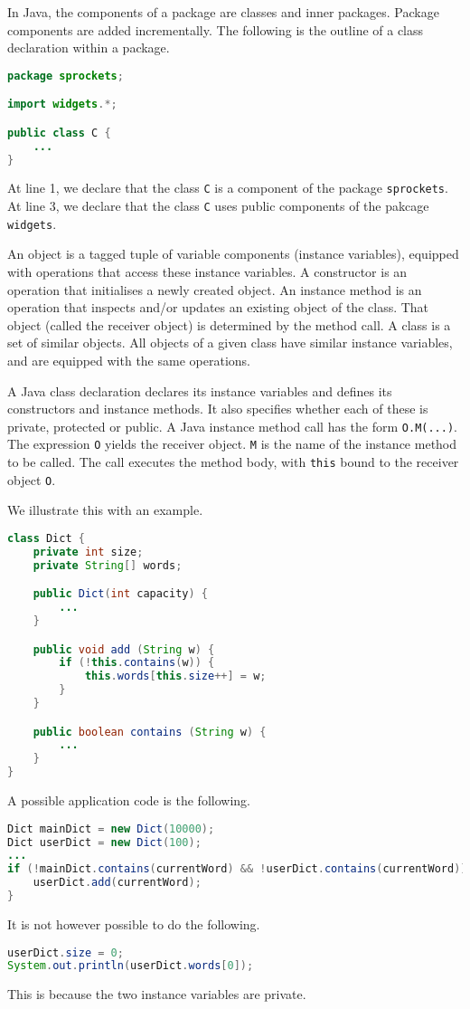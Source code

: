 \documentclass[a4paper, openany]{memoir}
\begin{document}
In Java, the components of a package are classes and inner packages. Package components are added incrementally. The following is the outline of a class declaration within a package.
\begin{lstlisting}[language=java]
package sprockets;

import widgets.*;

public class C {
    ...
}
\end{lstlisting}
At line 1, we declare that the class \texttt{C} is a component of the package \texttt{sprockets}. At line 3, we declare that the class \texttt{C} uses public components of the pakcage \texttt{widgets}.

An object is a tagged tuple of variable components (instance variables), equipped with operations that access these instance variables. A constructor is an operation that initialises a newly created object. An instance method is an operation that inspects and/or updates an existing object of the class. That object (called the receiver object) is determined by the method call. A class is a set of similar objects. All objects of a given class have similar instance variables, and are equipped with the same operations.

A Java class declaration declares its instance variables and defines its constructors and instance methods. It also specifies whether each of these is private, protected or public. A Java instance method call has the form \texttt{O.M(...)}. The expression \texttt{O} yields the receiver object. \texttt{M} is the name of the instance method to be called. The call executes the method body, with \texttt{this} bound to the receiver object \texttt{O}.

We illustrate this with an example.
\begin{lstlisting}[language=java]
class Dict {
    private int size;
    private String[] words;

    public Dict(int capacity) {
        ...
    }

    public void add (String w) {
        if (!this.contains(w)) {
            this.words[this.size++] = w;
        }
    }

    public boolean contains (String w) {
        ...
    }
}
\end{lstlisting}
A possible application code is the following.
\begin{lstlisting}[language=java]
Dict mainDict = new Dict(10000);
Dict userDict = new Dict(100);
...
if (!mainDict.contains(currentWord) && !userDict.contains(currentWord)) {
    userDict.add(currentWord);
}
\end{lstlisting}
It is not however possible to do the following.
\begin{lstlisting}[language=java]
userDict.size = 0;
System.out.println(userDict.words[0]);
\end{lstlisting}
This is because the two instance variables are private.
\end{document}
